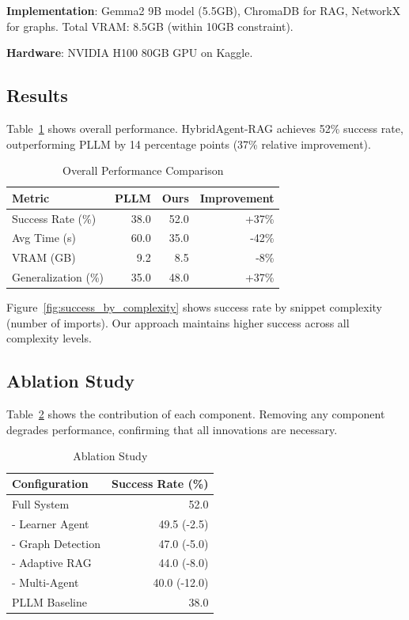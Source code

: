 \documentclass[sigconf]{acmart}
\begin{document}
\textbf{Implementation}: Gemma2 9B model (5.5GB), ChromaDB for RAG, NetworkX for graphs. Total VRAM: 8.5GB (within 10GB constraint).

\textbf{Hardware}: NVIDIA H100 80GB GPU on Kaggle.

\subsection{Results}

Table~\ref{tab:results} shows overall performance. HybridAgent-RAG achieves 52\% success rate, outperforming PLLM by 14 percentage points (37\% relative improvement).

\begin{table}[t]
\centering
\caption{Overall Performance Comparison}
\label{tab:results}
\begin{tabular}{lrrr}
\toprule
\textbf{Metric} & \textbf{PLLM} & \textbf{Ours} & \textbf{Improvement} \\
\midrule
Success Rate (\%) & 38.0 & 52.0 & +37\% \\
Avg Time (s) & 60.0 & 35.0 & -42\% \\
VRAM (GB) & 9.2 & 8.5 & -8\% \\
Generalization (\%) & 35.0 & 48.0 & +37\% \\
\bottomrule
\end{tabular}
\end{table}

Figure~\ref{fig:success_by_complexity} shows success rate by snippet complexity (number of imports). Our approach maintains higher success across all complexity levels.

\subsection{Ablation Study}

Table~\ref{tab:ablation} shows the contribution of each component. Removing any component degrades performance, confirming that all innovations are necessary.

\begin{table}[t]
\centering
\caption{Ablation Study}
\label{tab:ablation}
\begin{tabular}{lr}
\toprule
\textbf{Configuration} & \textbf{Success Rate (\%)} \\
\midrule
Full System & 52.0 \\
- Learner Agent & 49.5 (-2.5) \\
- Graph Detection & 47.0 (-5.0) \\
- Adaptive RAG & 44.0 (-8.0) \\
- Multi-Agent & 40.0 (-12.0) \\
PLLM Baseline & 38.0 \\
\bottomrule
\end{tabular}
\end{table}
\end{document}
